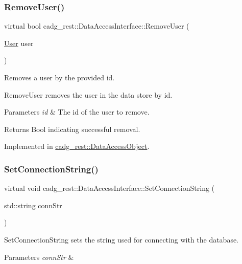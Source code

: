 \subsubsection{\texorpdfstring{RemoveUser()}{RemoveUser()}}
{\footnotesize\ttfamily virtual bool cadg\+\_\+rest\+::\+Data\+Access\+Interface\+::\+Remove\+User (\begin{DoxyParamCaption}\item[{\mbox{\hyperlink{structcadg__rest_1_1_user}{User}}}]{user }\end{DoxyParamCaption})\hspace{0.3cm}{\ttfamily [pure virtual]}}



Removes a user by the provided id. 

Remove\+User removes the user in the data store by id.


\begin{DoxyParams}{Parameters}
{\em id} & The id of the user to remove. \\
\hline
\end{DoxyParams}
\begin{DoxyReturn}{Returns}
Bool indicating successful removal. 
\end{DoxyReturn}


Implemented in \mbox{\hyperlink{classcadg__rest_1_1_data_access_object_a049df84fde79be3547fe363be40850e4}{cadg\+\_\+rest\+::\+Data\+Access\+Object}}.

\mbox{\label{classcadg__rest_1_1_data_access_interface_a919c1024501d1ba5eec4ff6dfce7c742}} 
\subsubsection{\texorpdfstring{SetConnectionString()}{SetConnectionString()}}
{\footnotesize\ttfamily virtual void cadg\+\_\+rest\+::\+Data\+Access\+Interface\+::\+Set\+Connection\+String (\begin{DoxyParamCaption}\item[{std\+::string}]{conn\+Str }\end{DoxyParamCaption})\hspace{0.3cm}{\ttfamily [pure virtual]}}

Set\+Connection\+String sets the string used for connecting with the database. 
\begin{DoxyParams}{Parameters}
{\em conn\+Str} & \\
\hline
\end{DoxyParams}


